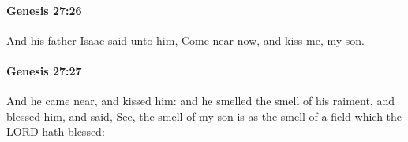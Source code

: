 		\paragraph{Genesis 27:26} %
			\label{GENESIS-27-26}

			And his father Isaac said unto him, Come near now, and kiss me, my son.


		\paragraph{Genesis 27:27} %
			\label{GENESIS-27-27}

			And he came near, and kissed him: and he smelled the smell of his raiment, and blessed him, and said, See, the smell of my son is as the smell of a field which the LORD hath blessed:


